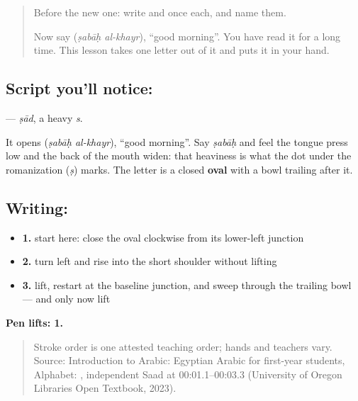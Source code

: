 \label{lesson:AR-W46-sad}



\begin{quote}
Before the new one: write  and  once each, and name them.

Now say \textbf{ } (\emph{ṣabāḥ al-khayr}), \textquotedblleft{}good morning\textquotedblright{}. You have read it for a long time. This lesson takes one letter out of it and puts it in your hand.
\end{quote}

\subsection*{Script you'll notice: }
\textbf{} — \emph{ṣād}, a heavy \emph{s}.

It opens \textbf{ } (\emph{ṣabāḥ al-khayr}), \textquotedblleft{}good morning\textquotedblright{}. Say \emph{ṣabāḥ} and feel the tongue press low and the back of the mouth widen: that heaviness is what the dot under the romanization (\emph{ṣ}) marks. The letter is a closed \textbf{oval} with a bowl trailing after it.

\subsection*{Writing: }

\begin{itemize}
\raggedright
  \item \textbf{1.} start here: close the oval clockwise from its lower-left junction
  \item \textbf{2.} turn left and rise into the short shoulder without lifting
  \item \textbf{3.} lift, restart at the baseline junction, and sweep through the trailing bowl — and only now lift
\end{itemize}

\textbf{Pen lifts: 1.}

\begin{quote}
Stroke order is one attested teaching order; hands and teachers vary. Source: Introduction to Arabic: Egyptian Arabic for first-year students, Alphabet:    , independent Saad at 00:01.1–00:03.3 (University of Oregon Libraries Open Textbook, 2023).
\end{quote}

